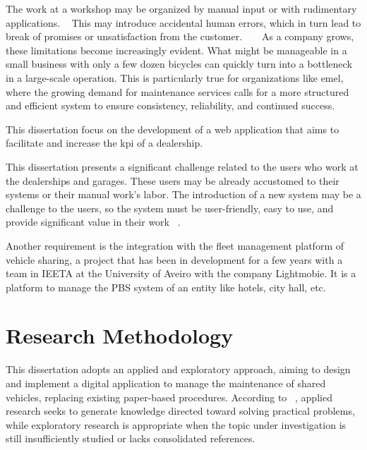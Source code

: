 The work at a workshop may be organized by manual input or with rudimentary applications. ~\cite{MAS_MOTORS} 
This may introduce accidental human errors, which in turn lead to break of promises or unsatisfaction from the customer. ~\cite{MAS_MOTORS} ~\cite{Setting_the_after_sale_process}
As a company grows, these limitations become increasingly evident. What might be manageable in a small business with only a few dozen bicycles can quickly turn into a bottleneck in a large-scale operation. This is particularly true for organizations like \ac{emel}, where the growing demand for maintenance services calls for a more structured and efficient system to ensure consistency, reliability, and continued success.


This dissertation focus on the development of a web application that aims to facilitate and increase the \acs{kpi} of a dealership. 

This dissertation presents a significant challenge related to the users who work at the dealerships and garages. 
These users may be already accustomed to their systems or their manual work's labor.   
The introduction of a new system may be a challenge to the users, so the system must be user-friendly, easy to use, and provide significant value in their work ~\cite{ALI201635, Cieslak_2025}.

Another requirement is the integration with the fleet management platform of vehicle sharing, a project that has been in development for a few years with a team in \ac{IEETA} at the University of Aveiro with the company Lightmobie.
It is a platform to manage the \acs{PBS} system of an entity like hotels, city hall, etc.  

\section{Research Methodology}
\label{sec:methodology}

This dissertation adopts an applied and exploratory approach, aiming to design and implement a digital application to manage the maintenance of shared vehicles, replacing existing paper-based procedures. According to ~\citet{Gil_2008}, applied research seeks to generate knowledge directed toward solving practical problems, while exploratory research is appropriate when the topic under investigation is still insufficiently studied or lacks consolidated references.

